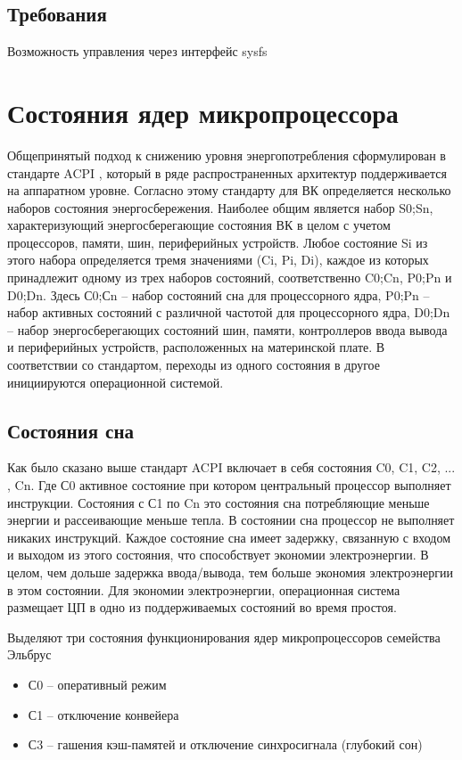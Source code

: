 \documentclass{article}
\begin{document}
\subsection{Требования}
Возможность управления через интерфейс sysfs


\newpage
\section{Состояния ядер микропроцессора}

Общепринятый подход к снижению уровня энергопотребления сформулирован в стандарте ACPI \cite{acpi}, который в ряде распространенных архитектур поддерживается на аппаратном уровне. Согласно этому стандарту для ВК определяется несколько наборов состояния энергосбережения. Наиболее общим является набор {S0;Sn}, характеризующий энергосберегающие состояния ВК в целом с учетом процессоров, памяти, шин, периферийных устройств. Любое состояние Si из этого набора определяется тремя значениями (Ci, Pi, Di), каждое из которых принадлежит одному из трех наборов состояний, соответственно {C0;Cn}, {P0;Pn} и {D0;Dn}. Здесь {С0;Сn} – набор состояний сна для процессорного ядра, {P0;Pn} – набор активных состояний с различной частотой для процессорного ядра, {D0;Dn} – набор энергосберегающих состояний шин, памяти, контроллеров ввода вывода и периферийных устройств, расположенных на материнской плате. В соответствии со стандартом, переходы из одного состояния в другое инициируются операционной системой. 

\subsection{Состояния сна}

Как было сказано выше стандарт ACPI включает в себя состояния C0, C1, C2, ... , Cn. Где С0 активное состояние при котором центральный процессор выполняет инструкции. Состояния с С1 по Cn это состояния сна потребляющие меньше энергии и рассеивающие меньше тепла. В состоянии сна процессор не выполняет никаких инструкций. Каждое состояние сна имеет задержку, связанную с входом и выходом из этого состояния, что способствует экономии электроэнергии. В целом, чем дольше задержка ввода/вывода, тем больше экономия электроэнергии в этом состоянии. Для экономии электроэнергии, операционная система размещает ЦП в одно из поддерживаемых состояний во время простоя.

Выделяют три состояния функционирования ядер микропроцессоров семейства Эльбрус\cite{kravc1,kravc2}
\begin{itemize}
\item С0 – оперативный режим
\item С1 – отключение конвейера
\item С3 – гашения кэш-памятей и отключение синхросигнала (глубокий сон)
\end{itemize}
\end{document}

